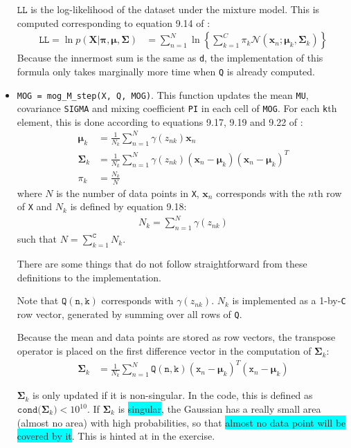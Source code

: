 \documentclass[a4paper,11pt]{article}
\newcommand{\V}[1]{\ensuremath{\mathbf{#1}}}
\newcommand{\T}[1]{\ensuremath{\mathtt{#1}}}
\newcommand{\muk}{\ensuremath{\boldsymbol{\mu}_k}}
\newcommand{\mean}{\ensuremath{\boldsymbol{\mu}}}
\newcommand{\cov}{\ensuremath{\boldsymbol{\Sigma}}}
\newcommand{\covk}{\ensuremath{\boldsymbol{\Sigma}_k}}
\newcommand{\mck}{\ensuremath{\pi_{k}}}
\newcommand{\mc}{\ensuremath{\boldsymbol{\pi}}}
\newcommand{\hl}[1]{\colorbox{cyan}{#1}}
\begin{document}
\begin{itemize}
$\T{LL}$ is the log-likelihood of the dataset under the mixture model.  This is computed corresponding to equation 9.14 of \cite{Bishop}:
\begin{align*}
\T{LL} = \ln p(\V{X} | \mc, \mean, \cov) &= \sum_{n=1}^{N} \ln \left\{ \sum_{k=1}^{C} \mck \mathcal{N}(\V{x}_n ; \muk, \covk) \right\}
\end{align*}
Because the innermost sum is the same as \texttt{d}, the implementation of this formula only takes marginally more time when \texttt{Q} is already computed.
%
\item \texttt{MOG = mog\_M\_step(X, Q, MOG)}.  This function updates the mean \texttt{MU}, covariance \texttt{SIGMA} and mixing coefficient \texttt{PI} in each cell of \texttt{MOG}.  For each \texttt{k}th element, this is done according to equations 9.17, 9.19 and 9.22 of \cite{Bishop}:
\begin{align*}
\muk &= \frac{1}{N_k} \sum_{n=1}^{N} \gamma(z_{nk}) \V{x}_n \\
\covk &= \frac{1}{N_k} \sum_{n=1}^{N} \gamma(z_{nk}) (\V{x}_n - \muk) (\V{x}_n - \muk)^T \\
\mck &= \frac{N_k}{N}
\end{align*}
where $N$ is the number of data points in \texttt{X}, $\V{x}_n$ corresponds with the $n$th row of \texttt{X} and $N_k$ is defined by equation 9.18:
\begin{align*}
N_k = \sum_{n=1}^{N} \gamma(z_{nk})
\end{align*}
such that $N = \sum_{k=1}^{\T{C}} N_k$.

There are some things that do not follow straightforward from these definitions to the implementation.  

Note that $\T{Q(n,k)}$ corresponds with $\gamma(z_{nk})$. $N_k$ is implemented as a 1-by-\texttt{C} row vector, generated by summing over all rows of \texttt{Q}.

Because the mean and data points are stored as row vectors, the transpose operator is placed on the first difference vector in the computation of $\covk$:
\begin{align*}
\covk &= \frac{1}{N_k} \sum_{n=1}^{N} \T{Q(n,k)} (\T{x}_n - \muk)^T (\T{x}_n - \muk)
\end{align*}

$\covk$ is only updated if it is non-singular.  In the code, this is defined as $\T{cond(}\covk\T{)} < 10^{10}$.  If $\covk$ is \hl{singular}, the Gaussian has a really small area (almost no area) with high probabilities, so that \hl{almost no data point will be covered by it}.  This is hinted at in the exercise.

\end{itemize}
\end{document}
